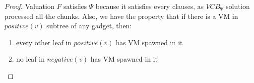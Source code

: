 \begin{proof}
Valuation $F$ satisfies $\Psi$ because it satisfies every clauses, as
$VCB_{\Psi}$ solution processed all the chunks. Also, we have the
property that if there is a VM in $positive(v)$ subtree of any gadget,
then:
\begin{enumerate}
\item every other leaf in $positive(v)$ has VM spawned in it
\item no leaf in $negative(v)$ has VM spawned in it
\end{enumerate}


\end{proof}
